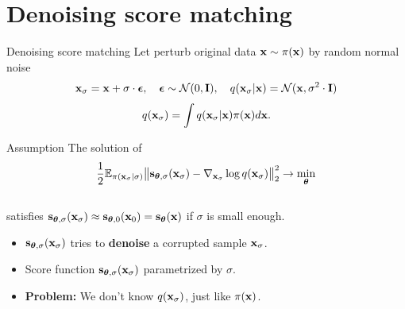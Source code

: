 \section{Denoising score matching}
\begin{frame}{Denoising score matching}
	Let perturb original data $\mathbf{x} \sim \pi(\mathbf{x})$ by random normal noise 
	\[
		\mathbf{x}_{\sigma} = \mathbf{x} + \sigma \cdot \boldsymbol{\epsilon}, \quad \boldsymbol{\epsilon} \sim \mathcal{N}(0, \mathbf{I}), \quad q(\mathbf{x}_{\sigma} | \mathbf{x}) = \mathcal{N}(\mathbf{x}, \sigma^2 \cdot \mathbf{I})
	\]
	\vspace{-0.4cm}
	\[
		q(\mathbf{x}_{\sigma}) = \int q(\mathbf{x}_{\sigma} | \mathbf{x}) \pi(\mathbf{x}) d\mathbf{x}.
	\]
	\vspace{-0.4cm} 
	\begin{block}{Assumption}
		The solution of 
		\[
			\frac{1}{2} \mathbb{E}_{\pi(\mathbf{x}_{\sigma} | \sigma)}\bigl\| \mathbf{s}_{\boldsymbol{\theta}, \sigma}(\mathbf{x}_{\sigma}) - \nabla_{\mathbf{x}_{\sigma}} \log q(\mathbf{x}_{\sigma}) \bigr\|^2_2 \rightarrow \min_{\boldsymbol{\theta}}
		\]
		\vspace{-0.3cm} \\
		satisfies $\mathbf{s}_{\boldsymbol{\theta}, \sigma}(\mathbf{x}_{\sigma}) \approx \mathbf{s}_{\boldsymbol{\theta}, 0}(\mathbf{x}_0) = \mathbf{s}_{\boldsymbol{\theta}}(\mathbf{x})$ if $\sigma$ is small enough.
	\end{block}
	\begin{itemize}
		\item $\mathbf{s}_{\boldsymbol{\theta}, \sigma}(\mathbf{x}_{\sigma})$ tries to \textbf{denoise} a corrupted sample $\mathbf{x}_{\sigma}$.
		\item Score function $\mathbf{s}_{\boldsymbol{\theta}, \sigma}(\mathbf{x}_{\sigma})$ parametrized by $\sigma$. 
		\item \textbf{Problem:} We don't know $q(\mathbf{x}_{\sigma})$, just like $\pi(\mathbf{x})$.
	\end{itemize}
\end{frame}
